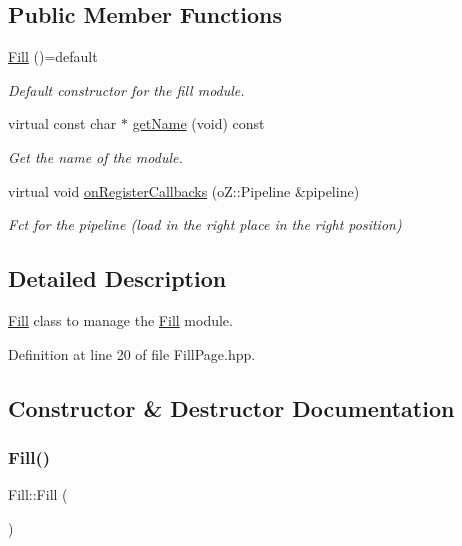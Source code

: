 \subsection*{Public Member Functions}
\begin{DoxyCompactItemize}
\item 
\hyperlink{class_fill_a686b6c06d79a3e7272cc400f29aa7e44}{Fill} ()=default
\begin{DoxyCompactList}\small\item\em Default constructor for the fill module. \end{DoxyCompactList}\item 
virtual const char $\ast$ \hyperlink{class_fill_a5116eca7a853356f420f6474ade0983b}{get\+Name} (void) const
\begin{DoxyCompactList}\small\item\em Get the name of the module. \end{DoxyCompactList}\item 
virtual void \hyperlink{class_fill_a440901ea6a6270194ca7e0e19c9bd88e}{on\+Register\+Callbacks} (o\+Z\+::\+Pipeline \&pipeline)
\begin{DoxyCompactList}\small\item\em Fct for the pipeline (load in the right place in the right position) \end{DoxyCompactList}\end{DoxyCompactItemize}


\subsection{Detailed Description}
\hyperlink{class_fill}{Fill} class to manage the \hyperlink{class_fill}{Fill} module. 

Definition at line 20 of file Fill\+Page.\+hpp.



\subsection{Constructor \& Destructor Documentation}
\mbox{\label{class_fill_a686b6c06d79a3e7272cc400f29aa7e44}} 
\subsubsection{\texorpdfstring{Fill()}{Fill()}}
{\footnotesize\ttfamily Fill\+::\+Fill (\begin{DoxyParamCaption}{ }\end{DoxyParamCaption})\hspace{0.3cm}{\ttfamily [default]}}



